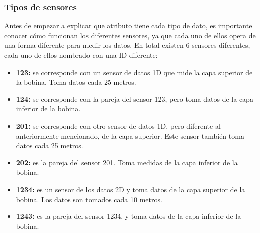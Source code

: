 \subsubsection{Tipos de sensores}
Antes de empezar a explicar que atributo tiene cada tipo de dato, es importante conocer cómo funcionan los diferentes sensores, ya que cada uno de ellos opera de una forma diferente para medir los datos. En total existen 6 sensores diferentes, cada uno de ellos nombrado con una ID diferente:
\begin{itemize}
    \item \textbf{123:} se corresponde con un sensor de datos 1D que mide la capa superior de la bobina. Toma datos cada 25 metros.
    \item \textbf{124:} se corresponde con la pareja del sensor 123, pero toma datos de la capa inferior de la bobina.
    \item \textbf{201:} se corresponde con otro sensor de datos 1D, pero diferente al anteriormente mencionado, de la capa superior. Este sensor también toma datos cada 25 metros.
    \item \textbf{202:} es la pareja del sensor 201. Toma medidas de la capa inferior de la bobina.
    \item \textbf{1234:} es un sensor de los datos 2D y toma datos de la capa superior de la bobina. Los datos son tomados cada 10 metros.
    \item \textbf{1243:} es la pareja del sensor 1234, y toma datos de la capa inferior de la bobina.
\end{itemize}

